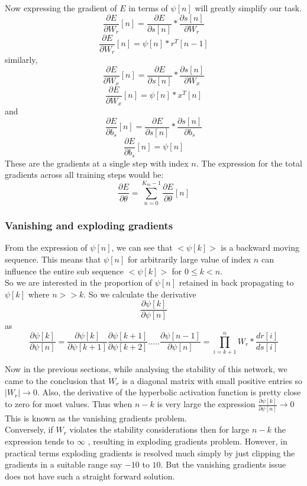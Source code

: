 \documentclass[12pt,letterpaper]{article}
\begin{document}
Now expressing the gradient of $E$ in terms of $\psi[n]$ will greatly simplify our task.
\[
\frac{\partial{E}}{\partial{W_{r}}}[n] = 
\frac{\partial{E}}{\partial{s[n]}}*\frac{\partial{s[n]}}{\partial{W_{r}}} \tag{8}
\]
\[
\frac{\partial{E}}{\partial{W_{r}}}[n] = \psi[n]*r^{T}[n-1]\tag{9}
\]
similarly,
\[
\frac{\partial{E}}{\partial{W_{x}}}[n] = \frac{\partial{E}}{\partial{s[n]}}*\frac{\partial{s[n]}}{\partial{W_{x}}}\tag{10}
\]
\[
\frac{\partial{E}}{\partial{W_{x}}}[n] = \psi[n]*x^{T}[n]\tag{11}
\]
and
\[
\frac{\partial{E}}{\partial{b_{s}}}[n] = \frac{\partial{E}}{\partial{s[n]}}*\frac{\partial{s[n]}}{\partial{b_{s}}}\tag{12}
\]
\[
\frac{\partial{E}}{\partial{b_{s}}}[n] = \psi[n]\tag{13}
\]
These are the gradients at a single step with index $n$.
The expression for the total gradients across all training steps would be:
\[
\frac{\partial{E}}{\partial{\theta}} = \sum_{n=0}^{K_{m}-1} \frac{\partial{E}}{\partial{\theta}}[n]\tag{14}
\]
\subsubsection{Vanishing and exploding gradients}
From the expression of $\psi[n]$, we can see that $<\psi[k]>$ is a backward moving sequence. This means that $\psi[n]$ for arbitrarily large value of index $n$ can influence the entire sub sequence $<\psi[k]>$ for $0\leq k<n$.\\
So we are interested in the proportion of $\psi[n]$ retained in back propagating to $\psi[k]$ where $n>>k$.
So we calculate the derivative
\[
\frac{\partial{\psi[k]}}{\partial{\psi[n]}}\tag{15}
\] as
\[
\frac{\partial{\psi[k]}}{\partial{\psi[n]}}=
\frac{\partial{\psi[k]}}{\partial{\psi[k+1]}}\frac{\partial{\psi[k+1]}}{\partial{\psi[k+2]}}.....\frac{\partial{\psi[n-1]}}{\partial{\psi[n]}}=
\prod_{i=k+1}^{n} W_{r}*\frac{dr[i]}{ds[i]}\tag{16}
\]

Now in the previous sections, while analysing the stability of this network, we came to the conclusion that $W_{r}$ is a diagonal matrix with small positive entries so $|W_{r}|\rightarrow{0} $.
Also, the derivative of the hyperbolic activation function is pretty close to zero for most values.
Thus when $n-k$ is very large the expression $\frac{\partial{\psi[k]}}{\partial{\psi[n]}} \rightarrow{0}$
This is known as the vanishing gradients problem.
\\
Conversely, if $W_{r}$ violates the stability considerations then for large $n-k$ the expression tends to $\infty$ , resulting in exploding gradients problem.
However, in practical terms exploding gradients is resolved much simply by just clipping the gradients in a suitable range say $-10$ to $10$. But the vanishing gradients issue does not have such a straight forward solution.
\end{document}
